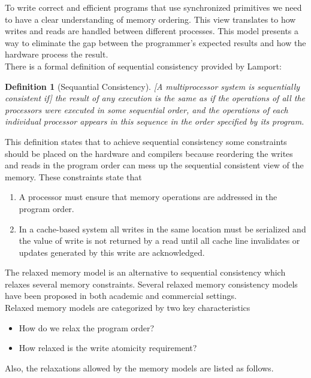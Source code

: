 \documentclass[a4paper, 11pt, twocolumn]{article}
\theoremstyle{nonumberplain}
\newtheorem{definition}{Definition}
\begin{document}
To write correct and efficient programs that use synchronized
primitives we need to have a clear understanding of memory ordering. This view
translates to how writes and reads are handled between different processes.
This model presents a way to eliminate the gap between the programmer's expected
results and how the hardware process the result. \\
There is a formal definition of sequential consistency provided by
Lamport\cite{ordering}:

\begin{definition}[Sequantial Consistency]
    [A multiprocessor system is sequentially consistent if] the result of any
    execution is the same as if the operations of all the processors were
    executed in some sequential order, and the operations of each individual
    processor appears in this sequence in the order specified by its program.
\end{definition}

This definition states that to achieve sequential consistency some
constraints should be placed on the hardware and compilers because reordering
the writes and reads in the program order can mess up the sequential consistent
view of the memory. These constraints state that

\begin{enumerate}
    \item A processor must ensure that memory operations are addressed in the
        program order.
    \item In a cache-based system all writes in the same location must be
        serialized and the value of write is not returned by a read until all
        cache line invalidates or updates generated by this write are
        acknowledged.
\end{enumerate}

The relaxed memory model is an alternative to sequential consistency
which relaxes several memory constraints. Several relaxed memory consistency
models have been proposed in both academic and commercial settings. \\
Relaxed memory models are categorized by two key characteristics
\begin{itemize}
    \item How do we relax the program order?
    \item How relaxed is the write atomicity requirement?
\end{itemize}

Also, the relaxations allowed by the memory models are listed as follows.
\end{document}
